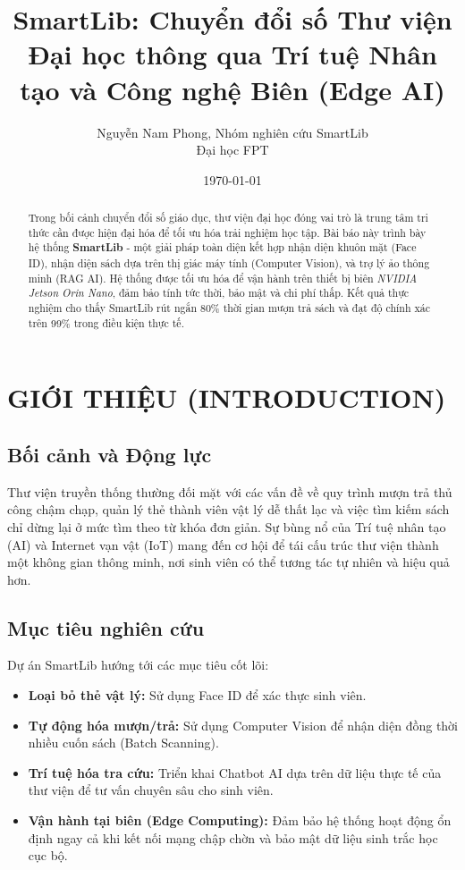 \documentclass[12pt,a4paper]{article}
\title{\textbf{SmartLib: Chuyển đổi số Thư viện Đại học thông qua Trí tuệ Nhân tạo và Công nghệ Biên (Edge AI)}}
\author{Nguyễn Nam Phong, Nhóm nghiên cứu SmartLib \\ Đại học FPT}
\date{\today}
\begin{document}
\maketitle

\begin{abstract}
Trong bối cảnh chuyển đổi số giáo dục, thư viện đại học đóng vai trò là trung tâm tri thức cần được hiện đại hóa để tối ưu hóa trải nghiệm học tập. Bài báo này trình bày hệ thống \textbf{SmartLib} - một giải pháp toàn diện kết hợp nhận diện khuôn mặt (Face ID), nhận diện sách dựa trên thị giác máy tính (Computer Vision), và trợ lý ảo thông minh (RAG AI). Hệ thống được tối ưu hóa để vận hành trên thiết bị biên \textit{NVIDIA Jetson Orin Nano}, đảm bảo tính tức thời, bảo mật và chi phí thấp. Kết quả thực nghiệm cho thấy SmartLib rút ngắn 80\% thời gian mượn trả sách và đạt độ chính xác trên 99\% trong điều kiện thực tế.
\end{abstract}

\tableofcontents
\newpage

\section{GIỚI THIỆU (INTRODUCTION)}

\subsection{Bối cảnh và Động lực}
Thư viện truyền thống thường đối mặt với các vấn đề về quy trình mượn trả thủ công chậm chạp, quản lý thẻ thành viên vật lý dễ thất lạc và việc tìm kiếm sách chỉ dừng lại ở mức tìm theo từ khóa đơn giản. Sự bùng nổ của Trí tuệ nhân tạo (AI) và Internet vạn vật (IoT) mang đến cơ hội để tái cấu trúc thư viện thành một không gian thông minh, nơi sinh viên có thể tương tác tự nhiên và hiệu quả hơn.

\subsection{Mục tiêu nghiên cứu}
Dự án SmartLib hướng tới các mục tiêu cốt lõi:
\begin{itemize}
    \item \textbf{Loại bỏ thẻ vật lý:} Sử dụng Face ID để xác thực sinh viên.
    \item \textbf{Tự động hóa mượn/trả:} Sử dụng Computer Vision để nhận diện đồng thời nhiều cuốn sách (Batch Scanning).
    \item \textbf{Trí tuệ hóa tra cứu:} Triển khai Chatbot AI dựa trên dữ liệu thực tế của thư viện để tư vấn chuyên sâu cho sinh viên.
    \item \textbf{Vận hành tại biên (Edge Computing):} Đảm bảo hệ thống hoạt động ổn định ngay cả khi kết nối mạng chập chờn và bảo mật dữ liệu sinh trắc học cục bộ.
\end{itemize}
\end{document}
